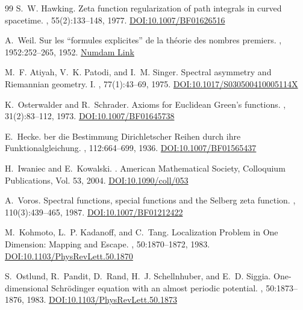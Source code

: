 \documentclass{article}
\numberwithin{equation}{section}
\theoremstyle{plain}
\theoremstyle{definition}
\theoremstyle{remark}
\begin{document}
\begin{thebibliography}{99}
S.~W. Hawking.
\newblock Zeta function regularization of path integrals in curved spacetime.
, 55(2):133--148, 1977.
\href{https://doi.org/10.1007/BF01626516}{DOI:10.1007/BF01626516}

A.~Weil.
\newblock Sur les ``formules explicites'' de la th{\'e}orie des nombres premiers.
, 1952:252--265, 1952.
\href{http://www.numdam.org/item?id=BSMF_1952__80__252_0}{Numdam Link}

M.~F. Atiyah, V.~K. Patodi, and I.~M. Singer.
\newblock Spectral asymmetry and Riemannian geometry. I.
, 77(1):43--69, 1975.
\href{https://doi.org/10.1017/S030500410005114X}{DOI:10.1017/S030500410005114X}

K.~Osterwalder and R.~Schrader.
\newblock Axioms for Euclidean Green's functions.
, 31(2):83--112, 1973.
\href{https://doi.org/10.1007/BF01645738}{DOI:10.1007/BF01645738}

E.~Hecke.
ber die Bestimmung Dirichletscher Reihen durch ihre Funktionalgleichung.
, 112:664--699, 1936.
\href{https://doi.org/10.1007/BF01565437}{DOI:10.1007/BF01565437}

H.~Iwaniec and E.~Kowalski.
.
\newblock American Mathematical Society, Colloquium Publications, Vol. 53, 2004.
\href{https://doi.org/10.1090/coll/053}{DOI:10.1090/coll/053}

A.~Voros.
\newblock Spectral functions, special functions and the Selberg zeta function.
, 110(3):439--465, 1987.
\href{https://doi.org/10.1007/BF01212422}{DOI:10.1007/BF01212422}

M.~Kohmoto, L.~P. Kadanoff, and C.~Tang.
\newblock Localization Problem in One Dimension: Mapping and Escape.
, 50:1870--1872, 1983.
\href{https://doi.org/10.1103/PhysRevLett.50.1870}{DOI:10.1103/PhysRevLett.50.1870}

S.~Ostlund, R.~Pandit, D.~Rand, H.~J. Schellnhuber, and E.~D. Siggia.
\newblock One-dimensional Schr{\"o}dinger equation with an almost periodic potential.
, 50:1873--1876, 1983.
\href{https://doi.org/10.1103/PhysRevLett.50.1873}{DOI:10.1103/PhysRevLett.50.1873}


\end{thebibliography}
\end{document}
